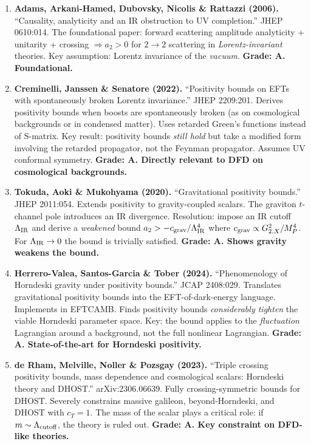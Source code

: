 \documentclass[11pt,a4paper]{article}
\begin{document}
\begin{enumerate}
\item \textbf{Adams, Arkani-Hamed, Dubovsky, Nicolis \& Rattazzi (2006).} ``Causality, analyticity and an IR obstruction to UV completion.'' JHEP 0610:014. The foundational paper: forward scattering amplitude analyticity + unitarity + crossing $\Rightarrow a_2 > 0$ for $2 \to 2$ scattering in \emph{Lorentz-invariant} theories. Key assumption: Lorentz invariance of the \emph{vacuum}. \textbf{Grade: A. Foundational.}

\item \textbf{Creminelli, Janssen \& Senatore (2022).} ``Positivity bounds on EFTs with spontaneously broken Lorentz invariance.'' JHEP 2209:201. Derives positivity bounds when boosts are spontaneously broken (as on cosmological backgrounds or in condensed matter). Uses retarded Green's functions instead of S-matrix. Key result: positivity bounds \emph{still hold} but take a modified form involving the retarded propagator, not the Feynman propagator. Assumes UV conformal symmetry. \textbf{Grade: A. Directly relevant to DFD on cosmological backgrounds.}

\item \textbf{Tokuda, Aoki \& Mukohyama (2020).} ``Gravitational positivity bounds.'' JHEP 2011:054. Extends positivity to gravity-coupled scalars. The graviton $t$-channel pole introduces an IR divergence. Resolution: impose an IR cutoff $\Lambda_{\rm IR}$ and derive a \emph{weakened} bound $a_2 > -c_{\rm grav}/\Lambda_{\rm IR}^4$ where $c_{\rm grav} \propto G_{2,X}^2/M_P^4$. For $\Lambda_{\rm IR} \to 0$ the bound is trivially satisfied. \textbf{Grade: A. Shows gravity weakens the bound.}

\item \textbf{Herrero-Valea, Santos-Garcia \& Tober (2024).} ``Phenomenology of Horndeski gravity under positivity bounds.'' JCAP 2408:029. Translates gravitational positivity bounds into the EFT-of-dark-energy language. Implements in EFTCAMB. Finds positivity bounds \emph{considerably tighten} the viable Horndeski parameter space. Key: the bound applies to the \emph{fluctuation} Lagrangian around a background, not the full nonlinear Lagrangian. \textbf{Grade: A. State-of-the-art for Horndeski positivity.}

\item \textbf{de Rham, Melville, Noller \& Pozsgay (2023).} ``Triple crossing positivity bounds, mass dependence and cosmological scalars: Horndeski theory and DHOST.'' arXiv:2306.06639. Fully crossing-symmetric bounds for DHOST. Severely constrains massive galileon, beyond-Horndeski, and DHOST with $c_T = 1$. The mass of the scalar plays a critical role: if $m \sim \Lambda_{\rm cutoff}$, the theory is ruled out. \textbf{Grade: A. Key constraint on DFD-like theories.}


\end{enumerate}
\end{document}
